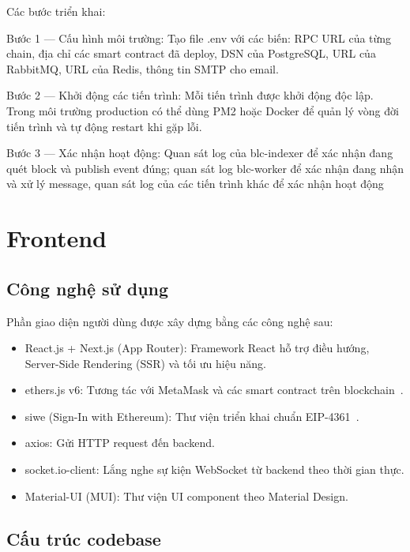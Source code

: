 \documentclass[../DoAn.tex]{subfiles}
\begin{document}
Các bước triển khai:

Bước 1 --- Cấu hình môi trường: Tạo file .env với các biến: RPC URL của từng chain, địa chỉ các smart contract đã deploy, DSN của PostgreSQL, URL của RabbitMQ, URL của Redis, thông tin SMTP cho email.

Bước 2 --- Khởi động các tiến trình: Mỗi tiến trình được khởi động độc lập. Trong môi trường production có thể dùng PM2 hoặc Docker để quản lý vòng đời tiến trình và tự động restart khi gặp lỗi.

Bước 3 --- Xác nhận hoạt động: Quan sát log của blc-indexer để xác nhận đang quét block và publish event đúng; quan sát log blc-worker để xác nhận đang nhận và xử lý message, quan sát log của các tiến trình khác để xác nhận hoạt động

\section{Frontend}


\subsection{Công nghệ sử dụng}


Phần giao diện người dùng được xây dựng bằng các công nghệ sau:

\begin{itemize}
  \item React.js + Next.js (App Router): Framework React hỗ trợ điều hướng, Server-Side Rendering (SSR) và tối ưu hiệu năng.
  \item ethers.js v6: Tương tác với MetaMask và các smart contract trên blockchain~\cite{EthersJsDocs}.
  \item siwe (Sign-In with Ethereum): Thư viện triển khai chuẩn EIP-4361~\cite{EIP4361}.
  \item axios: Gửi HTTP request đến backend.
  \item socket.io-client: Lắng nghe sự kiện WebSocket từ backend theo thời gian thực.
  \item Material-UI (MUI): Thư viện UI component theo Material Design.
\end{itemize}


\subsection{Cấu trúc codebase}
\end{document}
